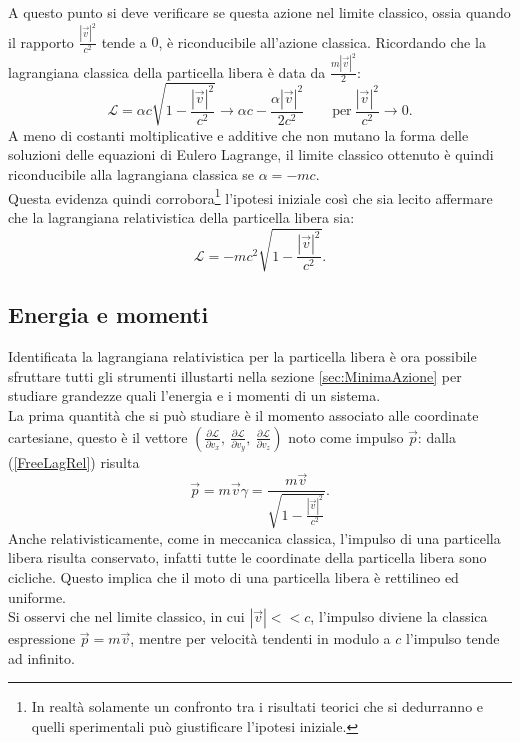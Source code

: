 A questo punto si deve verificare se questa azione nel limite classico, ossia quando il rapporto $\frac{|\vec{v}|^2}{c^2}$ tende a $0$, è riconducibile all'azione classica. Ricordando che la lagrangiana classica della particella libera è data da $\frac{m|\vec{v}|^2}{2} $:
\begin{equation*}
    \mathcal{L} =\alpha c \sqrt{1-\frac{|\vec{v}|^2}{c^2}}\longrightarrow \alpha c - \frac{\alpha |\vec{v}|^2}{2c^2}\qquad \text{per}\ \frac{|\vec{v}|^2}{c^2}\rightarrow 0.
\end{equation*}
A meno di costanti moltiplicative e additive che non mutano la forma delle soluzioni delle equazioni di Eulero Lagrange, il limite classico ottenuto è quindi riconducibile alla lagrangiana classica se $\alpha=-mc$.\\
Questa evidenza quindi corrobora\footnote{In realtà solamente un confronto tra i risultati teorici che si dedurranno e quelli sperimentali può giustificare l'ipotesi iniziale.} l'ipotesi iniziale così che sia lecito affermare che la lagrangiana relativistica della particella libera sia:
\begin{equation}\label{FreeLagRel}
    \mathcal{L} = -mc^2\sqrt{1-\frac{|\vec{v}|^2}{c^2}}.
\end{equation}
\subsection{Energia e momenti}\label{sec:LagRelEnMo}
Identificata la lagrangiana relativistica per la particella libera è ora possibile sfruttare tutti gli strumenti illustarti nella sezione \ref{sec:MinimaAzione} per studiare grandezze quali l'energia e i momenti di un sistema.\\

La prima quantità che si può studiare è il momento associato alle coordinate cartesiane, questo è il vettore  $(\frac{\partial \mathcal{L} }{\partial v_x},\ \frac{\partial \mathcal{L} }{\partial v_y},\ \frac{\partial \mathcal{L} }{\partial v_z})$ noto come impulso $\vec p$: dalla (\ref{FreeLagRel}) risulta
\begin{equation}
    \vec{p}=m\vec{v}\gamma=\frac{m\vec{v}}{\sqrt{1-\frac{|\vec{v}|^2}{c^2}}}.
    \label{impulsoRel}
\end{equation}
Anche relativisticamente, come in meccanica classica, l'impulso di una particella libera risulta conservato, infatti tutte le coordinate della particella libera sono cicliche. Questo implica che il moto di una particella libera è rettilineo ed uniforme.\\
Si osservi che nel limite classico, in cui $|\vec{v}|<<c$, l'impulso diviene la classica espressione $\vec p=m\vec v$, mentre per velocità tendenti in modulo a $c$ l'impulso tende ad infinito.\\

